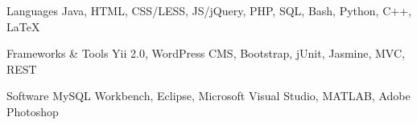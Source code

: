 


\begin{cvskills}


\cvskill
{Languages} %
{Java, HTML, CSS/LESS, JS/jQuery, PHP, SQL, Bash, Python, C++, LaTeX} %


\cvskill
{Frameworks \& Tools} %
{Yii 2.0, WordPress CMS, Bootstrap, jUnit, Jasmine, MVC, REST} %


\cvskill
{Software} %
{MySQL Workbench, Eclipse, Microsoft Visual Studio, MATLAB, Adobe Photoshop} 


\end{cvskills}